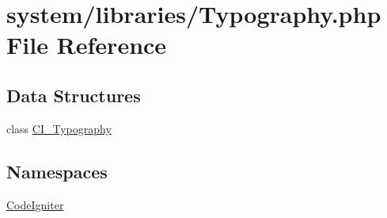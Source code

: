 \hypertarget{_typography_8php}{}\section{system/libraries/\+Typography.php File Reference}
\label{_typography_8php}
\subsection*{Data Structures}
\begin{DoxyCompactItemize}
\item 
class \mbox{\hyperlink{class_c_i___typography}{C\+I\+\_\+\+Typography}}
\end{DoxyCompactItemize}
\subsection*{Namespaces}
\begin{DoxyCompactItemize}
\item 
 \mbox{\hyperlink{namespace_code_igniter}{Code\+Igniter}}
\end{DoxyCompactItemize}
